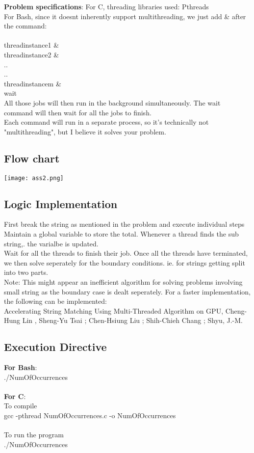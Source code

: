 \documentclass[paper=a4, fontsize=11pt]{scrartcl} %
\numberwithin{equation}{section} %
\numberwithin{figure}{section} %
\numberwithin{table}{section} %
\begin{document}
\textbf{Problem specifications}:
For C, threading libraries used: Pthreads\\
For Bash, since it doesnt inherently support multithreading, we just add \& after the command:\\
\\
threadinstance1  \& \\
threadinstance2  \&  \\
..\\
..\\
threadinstancem \& \\
wait\\

All those jobs will then run in the background simultaneously. The wait command will then wait for all the jobs to finish.\\
Each command will run in a separate process, so it's technically not "multithreading", but I believe it solves your problem.\\

\subsection{Flow chart}
 {\center\texttt{[image: ass2.png]}}

\subsection{Logic Implementation}
First break the string as mentioned in the problem and execute individual steps\\
Maintain a global variable to store the total. Whenever a thread finds  the sub string,. the varialbe is updated.\\
Wait for all the threads to finish their job. Once all the threads have terminated, we then solve seperately for the boundary conditions. ie. for strings getting split into two parts.\\
Note: This might appear an inefficient algorithm for solving problems involving small string as the boundary case is dealt seperately. For a faster implementation, the following can be implemented:\\

Accelerating String Matching Using Multi-Threaded Algorithm on GPU, Cheng-Hung Lin , Sheng-Yu Tsai ; Chen-Hsiung Liu ; Shih-Chieh Chang ; Shyu, J.-M.


\subsection{Execution Directive}
\textbf{For Bash}:\\
./NumOfOccurrences\\
\\
\textbf{For C}:\\
To compile\\
gcc -pthread NumOfOccurrences.c -o NumOfOccurrences\\
\\
To run the program\\
./NumOfOccurrences
\end{document}
